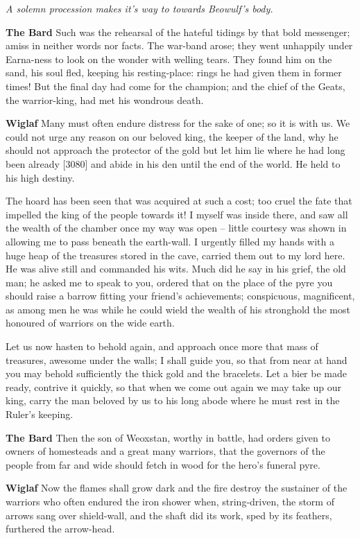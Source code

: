 \documentclass[a4paper]{article}
\begin{document}
{\centerline{\textit{A solemn procession makes it's way to towards Beowulf's body.}}

\textbf{The Bard} Such was the rehearsal of the hateful tidings
by that bold messenger; amiss in neither
words nor facts. The war-band arose;
they went unhappily under Earna-ness
to look on the wonder with welling tears.
They found him on the sand, his soul fled,
keeping his resting-place: rings he had given them
in former times! But the final day
had come for the champion; and the chief of the Geats,
the warrior-king, had met his wondrous death.

\textbf{Wiglaf} Many must often endure distress
for the sake of one; so it is with us.
We could not urge any reason
on our beloved king, the keeper of the land,
why he should not approach the protector of the gold
but let him lie where he had long been already
[3080] and abide in his den until the end of the world.
He held to his high destiny.

The hoard has been seen
that was acquired at such a cost; too cruel the fate
that impelled the king of the people towards it!
I myself was inside there, and saw all
the wealth of the chamber once my way was open
– little courtesy was shown in allowing me to pass
beneath the earth-wall. I urgently filled
my hands with a huge heap of the treasures
stored in the cave, carried them out
to my lord here. He was alive still
and commanded his wits. Much did he say
in his grief, the old man; he asked me to speak to you,
ordered that on the place of the pyre you should raise
a barrow fitting your friend’s achievements;
conspicuous, magnificent, as among men he was
while he could wield the wealth of his stronghold
the most honoured of warriors on the wide earth.

Let us now hasten to behold again,
and approach once more that mass of treasures,
awesome under the walls; I shall guide you,
so that from near at hand you may behold sufficiently
the thick gold and the bracelets. Let a bier be
made ready,
contrive it quickly, so that when we come out again
we may take up our king, carry the man
beloved by us to his long abode
where he must rest in the Ruler’s keeping.

\textbf{The Bard} Then the son of Weoxstan, worthy in battle,
had orders given to owners of homesteads
and a great many warriors, that the governors of the people
from far and wide should fetch in wood
for the hero’s funeral pyre.

\textbf{Wiglaf} Now the flames shall grow dark
and the fire destroy the sustainer of the warriors
who often endured the iron shower
when, string-driven, the storm of arrows
sang over shield-wall, and the shaft did its work,
sped by its feathers, furthered the arrow-head.

}
\end{document}
